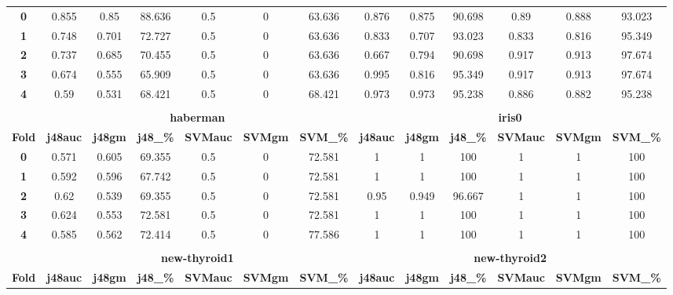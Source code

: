 {{\begin{tabular}{c|cccccc|cccccc}
\midrule
\textbf{0} & 0.855 & 0.85  & 88.636 & 0.5   & 0     & 63.636 & 0.876 & 0.875 & 90.698 & 0.89  & 0.888 & 93.023 \\
\textbf{1} & 0.748 & 0.701 & 72.727 & 0.5   & 0     & 63.636 & 0.833 & 0.707 & 93.023 & 0.833 & 0.816 & 95.349 \\
\textbf{2} & 0.737 & 0.685 & 70.455 & 0.5   & 0     & 63.636 & 0.667 & 0.794 & 90.698 & 0.917 & 0.913 & 97.674 \\
\textbf{3} & 0.674 & 0.555 & 65.909 & 0.5   & 0     & 63.636 & 0.995 & 0.816 & 95.349 & 0.917 & 0.913 & 97.674 \\
\textbf{4} & 0.59  & 0.531 & 68.421 & 0.5   & 0     & 68.421 & 0.973 & 0.973 & 95.238 & 0.886 & 0.882 & 95.238 \\
\multicolumn{1}{c}{} &       &       &       &       &       & \multicolumn{1}{c}{} &       &       &       &       &       &  \\
\multicolumn{1}{c}{} & \multicolumn{6}{c|}{\textbf{haberman}}        & \multicolumn{6}{c}{\textbf{iris0}} \\
\midrule
\textbf{Fold} & \textbf{j48auc} & \textbf{j48gm} & \textbf{j48\_\%} & \textbf{SVMauc} & \textbf{SVMgm} & \textbf{SVM\_\%} & \textbf{j48auc} & \textbf{j48gm} & \textbf{j48\_\%} & \textbf{SVMauc} & \textbf{SVMgm} & \textbf{SVM\_\%} \\
\midrule
\textbf{0} & 0.571 & 0.605 & 69.355 & 0.5   & 0     & 72.581 & 1     & 1     & 100   & 1     & 1     & 100 \\
\textbf{1} & 0.592 & 0.596 & 67.742 & 0.5   & 0     & 72.581 & 1     & 1     & 100   & 1     & 1     & 100 \\
\textbf{2} & 0.62  & 0.539 & 69.355 & 0.5   & 0     & 72.581 & 0.95  & 0.949 & 96.667 & 1     & 1     & 100 \\
\textbf{3} & 0.624 & 0.553 & 72.581 & 0.5   & 0     & 72.581 & 1     & 1     & 100   & 1     & 1     & 100 \\
\textbf{4} & 0.585 & 0.562 & 72.414 & 0.5   & 0     & 77.586 & 1     & 1     & 100   & 1     & 1     & 100 \\
\multicolumn{1}{c}{} &       &       &       &       &       & \multicolumn{1}{c}{} &       &       &       &       &       &  \\
\multicolumn{1}{c}{} & \multicolumn{6}{c|}{\textbf{new-thyroid1}}    & \multicolumn{6}{c}{\textbf{new-thyroid2}} \\
\midrule
\textbf{Fold} & \textbf{j48auc} & \textbf{j48gm} & \textbf{j48\_\%} & \textbf{SVMauc} & \textbf{SVMgm} & \textbf{SVM\_\%} & \textbf{j48auc} & \textbf{j48gm} & \textbf{j48\_\%} & \textbf{SVMauc} & \textbf{SVMgm} & \textbf{SVM\_\%} \\

\end{tabular}}}
